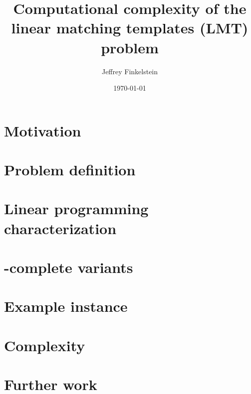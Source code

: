 \documentclass{lposter}
\title{Computational complexity of the linear matching templates (LMT) problem}
\author{Jeffrey Finkelstein}
\date{\today}
\theoremstyle{definition} \newtheorem*{definition}{Definition}
\begin{document}
\begin{poster}

\section{Motivation}


\section{Problem definition}


\section{Linear programming characterization}


\section{\NP-complete variants}


\section{Example instance}


\section{Complexity}


\section{Further work}


\end{poster}
\end{document}
